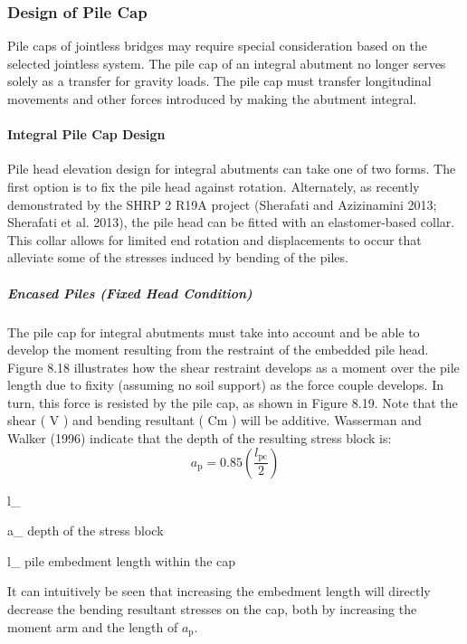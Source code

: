 \subsubsection{Design of Pile Cap}
Pile caps of jointless bridges may require special consideration based on the selected jointless system. The pile
cap of an integral abutment no longer serves solely as a transfer for gravity loads. The pile cap must transfer
longitudinal movements and other forces introduced by making the abutment integral.

\paragraph{Integral Pile Cap Design}
Pile head elevation design for integral abutments can take one of two forms. The first option is to fix the pile head
against rotation. Alternately, as recently demonstrated by the SHRP 2 R19A project (Sherafati and Azizinamini 2013; Sherafati et al. 2013), the pile head can be fitted with an elastomer-based collar. This collar allows for limited end
rotation and displacements to occur that alleviate some of the stresses induced by bending of the piles.

\subparagraph{Encased Piles (Fixed Head Condition)}
The pile cap for integral abutments must take into account and be able to develop the moment resulting from the
restraint of the embedded pile head. Figure 8.18 illustrates how the shear restraint develops as a moment over the pile
length due to fixity (assuming no soil support) as the force couple develops. In turn, this force is resisted by the pile
cap, as shown in Figure 8.19. Note that the shear ( V ) and bending resultant ( Cm ) will be additive. Wasserman and
Walker (1996) indicate that the depth of the resulting stress block is:
\begin{equation}
  a_\text{p}= 0.85\left(\frac{l_\text{pc}}{2}\right)
\end{equation}
\begin{EqDesc}{l_}
  \item [a_\text{p}] depth of the stress block
  \item [l_\text{pc}] pile embedment length within the cap
\end{EqDesc}

It can intuitively be seen that increasing the embedment length will directly decrease the bending resultant stresses on the cap, both by increasing the moment arm and the length of $a_\text{p}$.

